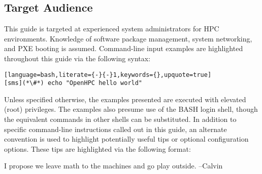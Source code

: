 \subsection{Target Audience}

This guide is targeted at experienced \Linux{} system administrators for HPC
environments. Knowledge of software package management, system networking, and
PXE booting is assumed. Command-line input examples are highlighted throughout
this guide via the following syntax:

\begin{lstlisting}[language=bash,literate={-}{-}1,keywords={},upquote=true]
[sms](*\#*) echo "OpenHPC hello world"
\end{lstlisting}

Unless specified otherwise, the examples presented are executed with
elevated (root) privileges. The examples also presume use of the BASH login
shell, though the equivalent commands in other shells can be substituted.
In addition to specific command-line instructions called out in this guide, an
alternate convention is used to highlight potentially useful tips or optional
configuration options. These tips are highlighted via the following format:

\begin{center}
\begin{tcolorbox}[]
\small
I propose we leave math to the machines and go play outside. --Calvin
\end{tcolorbox}
\end{center}

